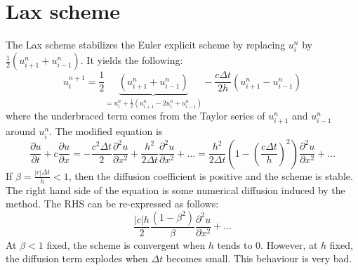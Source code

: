 \documentclass[12pt, openany]{report}
\theoremstyle{definition}
\begin{document}
\section{Lax scheme}
The Lax scheme stabilizes the Euler explicit scheme by replacing $u_i^n$ by $\frac{1}{2} \left(u_{i+1}^n + u_{i-1}^n\right)$. It yields the following:
\begin{equation}
	u_i^{n+1} = \frac{1}{2}\underbrace{\left(u_{i+1}^n + u_{i-1}^n\right)}_{=u_i^n + \frac{1}{2}(u_{i+1}^n - 2u_i^n + u_{i-1}^n)} - \frac{c\Delta t}{2h} \left(u_{i+1}^n - u_{i-1}^n\right) 
\end{equation}
where the underbraced term comes from the Taylor series of $u_{i+1}^n$ and $u_{i-1}^n$ around $u_i^n$. The modified equation is 
\begin{equation}
	\frac{\partial u}{\partial t} + c\frac{\partial u}{\partial x} = -\frac{c^2\Delta t}{2} \frac{\partial^2 u}{\partial x^2} + \frac{h^2}{2\Delta t} \frac{\partial^2 u}{\partial x^2} + \dots = \frac{h^2}{2\Delta t}\left(1-\left(\frac{c\Delta t}{h}\right)^2 \right) \frac{\partial^2 u}{\partial x^2}+ \dots 
\end{equation}
If $\beta=\frac{|c|\Delta t}{h} <1$, then the diffusion coefficient is positive and the scheme is stable. The right hand side of the equation is some numerical diffusion induced by the method. The RHS can be re-expressed as follows:
\begin{equation}
	\frac{|c|h}{2}\frac{(1-\beta^2)}{\beta} \frac{\partial ^2 u }{\partial x^2} + \dots 
\end{equation}
At $\beta<1$ fixed, the scheme is convergent when $h$ tends to 0. However, at $h$ fixed, the diffusion term explodes when $\Delta t$ becomes small. This behaviour is very bad. 
\end{document}
